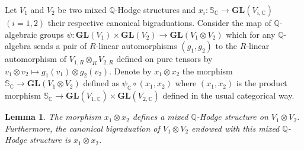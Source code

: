 \documentclass[10pt]{article}
\numberwithin{equation}{subsection}
\theoremstyle{plain}
\newtheorem{lemma}[theorem]{Lemma}
\theoremstyle{definition}
\theoremstyle{remark}
\newcommand{\Q}{\mathbb Q}
\newcommand{\C}{\mathbb C}
\newcommand{\s}{\mathbb S}
\newcommand{\gl}{\mathbf{GL}}
\begin{document}
Let $V_1$ and $V_2$ be two mixed $\Q$-Hodge structures and $x_i : \s_\C \rightarrow \gl(V_{i,\C})$ $(i=1,2)$ their respective canonical bigraduations. Consider the map of $\Q$-algebraic groups $\psi : \gl(V_1) \times \gl(V_2) \rightarrow \gl(V_1 \otimes V_2)$ which for any $\Q$-algebra sends a pair of $R$-linear automorphisms $(g_1,g_2)$ to the $R$-linear automorphism of $V_{1,R} \otimes_R V_{2,R}$ defined on pure tensors by $v_1 \otimes v_2 \mapsto g_1(v_1) \otimes g_2(v_2)$. Denote by $x_1 \otimes x_2$ the morphism $\s_\C \rightarrow \gl(V_1 \otimes V_2)$ defined as $\psi_\C \circ (x_1,x_2)$ where $(x_1,x_2)$ is the product morphism $\s_\C \rightarrow \gl(V_{1,\C}) \times \gl(V_{2,\C})$ defined in the usual categorical way.
\begin{lemma}\label{tens}
The morphism $x_1 \otimes x_2$ defines a mixed $\Q$-Hodge structure on $V_1 \otimes V_2$. Furthermore, the canonical bigraduation of $V_1 \otimes V_2$ endowed with this mixed $\Q$-Hodge structure is $x_1 \otimes x_2$.
\end{lemma}
\end{document}
